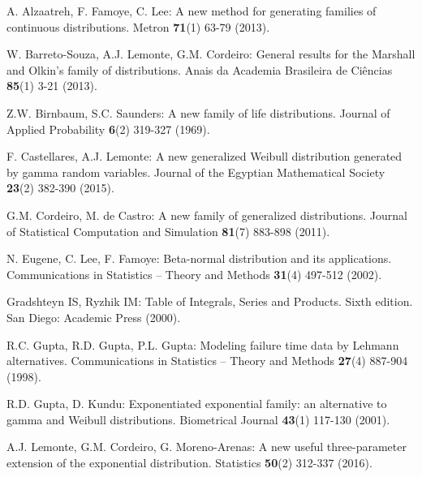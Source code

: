 \documentclass[twoside,leqno,11pt]{article}
\begin{document}
\begin{thebibliography}{8}


\item
A. Alzaatreh, F. Famoye, C. Lee:
A new method for generating families of continuous distributions.
Metron {\bf 71}(1) 63-79 (2013).

\item
W. Barreto-Souza, A.J. Lemonte, G.M. Cordeiro:
General results for the Marshall and Olkin's family of distributions.
Anais da Academia Brasileira de Ci\^{e}ncias {\bf 85}(1) 3-21 (2013).

\item
Z.W. Birnbaum, S.C. Saunders:
A new family of life distributions.
Journal of Applied Probability {\bf 6}(2) 319-327 (1969).

\item
F. Castellares, A.J. Lemonte:
A new generalized Weibull distribution gene\-rated by gamma random variables.
Journal of the Egyptian Mathematical Society {\bf 23}(2) 382-390 (2015).

\item
G.M. Cordeiro, M. de Castro:
A new family of generalized distributions.
Journal of Statistical Computation and Simulation {\bf 81}(7) 883-898 (2011).

\item
N. Eugene, C. Lee, F. Famoye:
Beta-normal distribution and its applications.
Communications in Statistics -- Theory and Methods {\bf 31}(4) 497-512 (2002).

\item

Gradshteyn IS, Ryzhik IM: Table of Integrals, Series and Products. Sixth edition. San Diego: Academic Press (2000).

\item
R.C. Gupta, R.D. Gupta, P.L. Gupta:
Modeling failure time data by Lehmann alternatives.
Communications in Statistics -- Theory and Methods {\bf 27}(4) 887-904 (1998).

\item
R.D. Gupta, D. Kundu:
Exponentiated exponential family: an alternative to gamma and Weibull distributions.
Biometrical Journal {\bf 43}(1) 117-130 (2001).


\item
A.J. Lemonte, G.M. Cordeiro, G. Moreno-Arenas:
A new useful three-parameter extension of the exponential distribution.
Statistics {\bf 50}(2) 312-337 (2016).


\end{thebibliography}
\end{document}
